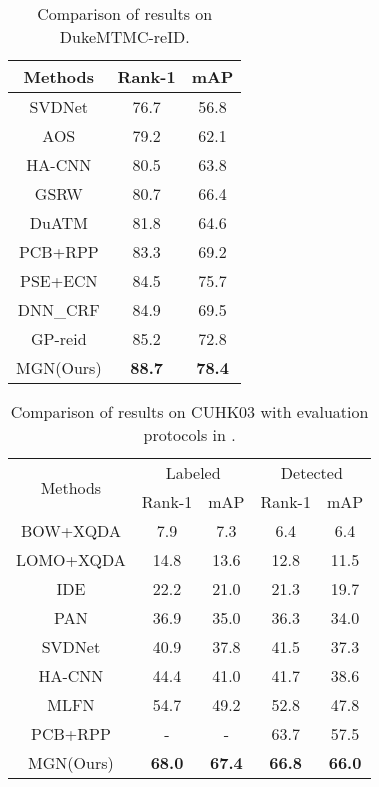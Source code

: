 \documentclass[sigconf]{acmart}
\begin{document}
\begin{table}
	\centering
	\label{tab:comparison_duke}
	\begin{tabular}{c|cc}
		\toprule
		Methods & Rank-1 & mAP \\
		\midrule
		SVDNet\cite{sun2017svdnet} & 76.7 & 56.8 \\
		AOS\cite{huang2018adversarially} & 79.2 & 62.1 \\
		HA-CNN\cite{li2018harmoniou} & 80.5 & 63.8 \\
		GSRW\cite{shen2018deep} & 80.7 & 66.4 \\
		DuATM\cite{si2018dual} & 81.8 & 64.6 \\
		PCB+RPP\cite{sun2017beyond} & 83.3 & 69.2 \\
		PSE+ECN\cite{sarfraz2017pose} & 84.5 & 75.7 \\
		DNN\_CRF\cite{chen2018group} & 84.9 & 69.5 \\
		GP-reid\cite{almazan2018red} & 85.2 & 72.8 \\ 
		\midrule
		MGN(Ours) & \textbf{88.7} & \textbf{78.4} \\
		\bottomrule
	\end{tabular}
	\caption{Comparison of results on DukeMTMC-reID.}
\end{table}

\begin{table}
	\label{tab:comparison_cuhk03}
	\centering
	\begin{tabular}{c|cc|cc}
		\toprule		\multirow{2}{*}{Methods} & \multicolumn{2}{c|}{Labeled} & \multicolumn{2}{c}{Detected}\\
		& Rank-1 & mAP & Rank-1 & mAP \\
		\midrule
		BOW+XQDA\cite{zheng2015scalable} & 7.9 & 7.3 & 6.4 & 6.4 \\
		LOMO+XQDA\cite{liao2015person} & 14.8 & 13.6 & 12.8 & 11.5 \\
		\midrule
		IDE\cite{zheng2016person} & 22.2 & 21.0 & 21.3 & 19.7 \\
		PAN\cite{zheng2017pedestrian} & 36.9 & 35.0 & 36.3 & 34.0 \\
		SVDNet\cite{sun2017svdnet} & 40.9 & 37.8 & 41.5 & 37.3 \\
		HA-CNN\cite{li2018harmoniou} & 44.4 & 41.0 & 41.7 & 38.6 \\
		MLFN\cite{chang2018multilevel} & 54.7 & 49.2 & 52.8 & 47.8 \\
		PCB+RPP\cite{sun2017beyond} & - & - & 63.7 & 57.5 \\
		\midrule
		MGN(Ours) & \textbf{68.0} & \textbf{67.4} & \textbf{66.8} & \textbf{66.0} \\ 
		\bottomrule
	\end{tabular}
	\caption{Comparison of results on CUHK03 with evaluation protocols in \cite{zhong2017rerank}.}
\end{table}
\end{document}
